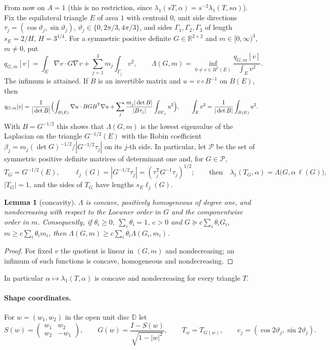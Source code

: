 \documentclass[11pt]{article}
\newtheorem{lemma}[theorem]{Lemma}
\theoremstyle{remark}
\newcommand{\R}{\mathbb{R}}
\newcommand{\cP}{\mathcal{P}}
\begin{document}
From now on $A=1$ (this is no restriction, since $\lambda_1(sT,\alpha)=s^{-2}\lambda_1(T,s\alpha)$).
Fix the equilateral triangle $E$ of area $1$ with centroid $0$, unit side directions
$\tau_j=(\cos\vartheta_j,\sin\vartheta_j)$, $\vartheta_j\in\{0,2\pi/3,4\pi/3\}$, and sides
$\Gamma_1,\Gamma_2,\Gamma_3$ of length $s_E=2/H$, $H=3^{1/4}$. For a symmetric positive definite
$G\in\R^{2\times2}$ and $m\in[0,\infty)^3$, $m\neq0$, put
\[
  q_{G,m}[v]=\int_E\nabla v\cdot G\nabla v+\sum_{j=1}^3m_j\int_{\Gamma_j}v^2,\qquad
  \Lambda(G,m)=\inf_{0\ne v\in H^1(E)}\frac{q_{G,m}[v]}{\int_Ev^2}.
\]
The infimum is attained. If $B$ is an invertible matrix and $u=v\circ B^{-1}$ on $B(E)$, then
\begin{equation}\label{p-eq:pullback}
  q_{G,m}[v]=\frac1{|\det B|}\Bigl(\int_{B(E)}\nabla u\cdot BGB^{\mathsf T}\nabla u
  +\sum_j\frac{m_j|\det B|}{|B\tau_j|}\int_{B\Gamma_j}u^2\Bigr),\qquad
  \int_Ev^2=\frac1{|\det B|}\int_{B(E)}u^2 .
\end{equation}
With $B=G^{-1/2}$ this shows that $\Lambda(G,m)$ is the lowest eigenvalue of the Laplacian on
the triangle $G^{-1/2}(E)$ with the Robin coefficient $\beta_j=m_j(\det G)^{-1/2}/|G^{-1/2}\tau_j|$
on its $j$-th side. In particular, let $\cP$ be the set of symmetric positive definite matrices
of determinant one and, for $G\in\cP$,
\[
  T_G=G^{-1/2}(E),\qquad \ell_j(G)=|G^{-1/2}\tau_j|=(\tau_j^{\mathsf T}G^{-1}\tau_j)^{1/2};
  \qquad\text{then}\quad \lambda_1(T_G,\alpha)=\Lambda\bigl(G,\alpha\,\ell(G)\bigr),
\]
$|T_G|=1$, and the sides of $T_G$ have lengths $s_E\ell_j(G)$.

\begin{lemma}[concavity]\label{p-lem:concave}
$\Lambda$ is concave, positively homogeneous of degree one, and nondecreasing with respect to the
Loewner order in $G$ and the componentwise order in $m$. Consequently, if
$\theta_i\ge0$, $\sum_i\theta_i=1$, $c>0$ and
$G\succeq c\sum_i\theta_iG_i$, $m\ge c\sum_i\theta_im_i$, then
$\Lambda(G,m)\ge c\sum_i\theta_i\Lambda(G_i,m_i)$.
\end{lemma}

\begin{proof}
For fixed $v$ the quotient is linear in $(G,m)$ and nondecreasing; an infimum of such
functions is concave, homogeneous and nondecreasing.
\end{proof}

In particular $\alpha\mapsto\lambda_1(T,\alpha)$ is concave and nondecreasing for every triangle
$T$.

\paragraph{Shape coordinates.} For $w=(w_1,w_2)$ in the open unit disc $\mathbb D$ let
\[
  S(w)=\begin{pmatrix}w_1&w_2\\ w_2&-w_1\end{pmatrix},\qquad
  G(w)=\frac{I-S(w)}{\sqrt{1-|w|^2}},\qquad T_w=T_{G(w)},\qquad
  e_j=(\cos2\vartheta_j,\sin2\vartheta_j).
\]
\end{document}
